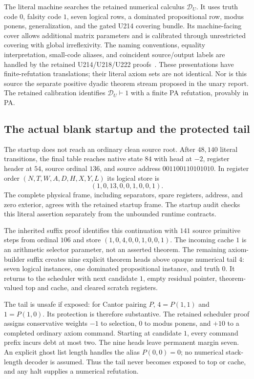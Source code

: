 The literal machine searches the retained numerical calculus
$\mathcal D_U$. It uses truth code $0$, falsity code $1$, seven logical
rows, a dominated propositional row, modus ponens, generalization, and
the gated U214 covering bundle. Its machine-facing cover allows additional
matrix parameters and is calibrated through unrestricted covering with
global irreflexivity. The naming conventions, equality interpretation,
small-code aliases, and coincident source/output labels are handled by
the retained U214/U218/U222 proofs~\cite{combined}. These presentations
have finite-refutation translations; their literal axiom sets are not
identical. Nor is this source the separate positive dyadic theorem stream
proposed in the unary report. The retained calibration identifies
$\mathcal D_U\vdash1$ with a finite PA refutation, provably in PA.

\subsection{The actual blank startup and the protected tail}

The startup does not reach an ordinary clean source root. After
$48{,}140$ literal transitions, the final table reaches native state $84$
with head at $-2$, register header at $54$, source ordinal $136$, and
source address $001100110101010$. In register order
$(N,T,W,A,D,H,X,Y,L)$ its logical store is
\[
                         (1,0,13,0,0,1,0,0,1).
\]
The complete physical frame, including separators, spare registers,
address, and zero exterior, agrees with the retained startup frame.
The startup audit checks this literal assertion separately from the
unbounded runtime contracts.

The inherited suffix proof identifies this continuation with $141$
source primitive steps from ordinal $106$ and store
$(1,0,4,0,0,1,0,0,1)$. The incoming cache $1$ is an arithmetic selector
parameter, not an asserted theorem. The remaining axiom-builder suffix
creates nine explicit theorem heads above opaque numerical tail $4$:
seven logical instances, one dominated propositional instance, and truth
$0$. It returns to the scheduler with next candidate $1$, empty residual
pointer, theorem-valued top and cache, and cleared scratch registers.

The tail is unsafe if exposed: for Cantor pairing $P$,
$4=P(1,1)$ and $1=P(1,0)$. Its protection is therefore substantive.
The retained scheduler proof assigns conservative weights $-1$ to
selection, $0$ to modus ponens, and $+10$ to a completed ordinary axiom
command. Starting at candidate $1$, every command prefix incurs debt at
most two. The nine heads leave permanent margin seven. An explicit ghost
list length handles the alias $P(0,0)=0$; no numerical stack-length
decoder is assumed. Thus the tail never becomes exposed to top or cache,
and any halt supplies a numerical refutation.

